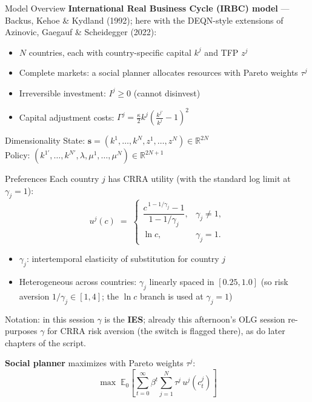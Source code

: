 \documentclass[aspectratio=169,11pt]{beamer}
\newcommand{\emphc}[1]{\textcolor{harvardcrimson}{#1}}
\newcommand{\R}{\mathbb{R}}
\begin{document}
\begin{frame}{Model Overview}
\textbf{International Real Business Cycle (IRBC) model} --- Backus, Kehoe \& Kydland (1992); here with the DEQN-style extensions of Azinovic, Gaegauf \& Scheidegger (2022):

\vspace{0.5em}
\begin{itemize}
    \item $N$ countries, each with \emphc{country-specific capital} $k^j$ and \emphc{TFP} $z^j$
    \item \emphc{Complete markets}: a social planner allocates resources with Pareto weights $\tau^j$
    \item \emphc{Irreversible investment}: $I^j \geq 0$ (cannot disinvest)
    \item \emphc{Capital adjustment costs}: $\Gamma^j = \frac{\kappa}{2} k^j \!\left(\frac{k^{j\prime}}{k^j} - 1\right)^{\!2}$
\end{itemize}

\vspace{0.5em}
\begin{block}{Dimensionality}
State: $\bm{s} = (k^1, \ldots, k^N, z^1, \ldots, z^N) \in \R^{2N}$\\
Policy: $(k^{1\prime}, \ldots, k^{N\prime}, \lambda, \mu^1, \ldots, \mu^N) \in \R^{2N+1}$
\end{block}
\end{frame}

\begin{frame}{Preferences}
\small
Each country $j$ has \emphc{CRRA utility} (with the standard log limit at $\gamma_j = 1$):
\[
u^j(c) \;=\; \begin{cases} \dfrac{c^{\,1 - 1/\gamma_j} - 1}{1 - 1/\gamma_j}, & \gamma_j \neq 1, \\[4pt] \ln c, & \gamma_j = 1. \end{cases}
\]

\vspace{0.2em}
\begin{itemize}\itemsep2pt
    \item $\gamma_j$: intertemporal elasticity of substitution for country $j$
    \item \emphc{Heterogeneous} across countries: $\gamma_j$ linearly spaced in $[0.25, 1.0]$ (so risk aversion $1/\gamma_j \in [1, 4]$; the $\ln c$ branch is used at $\gamma_j = 1$)
\end{itemize}

\vspace{0.2em}
{\scriptsize \emphc{Notation:} in this session $\gamma$ is the \textbf{IES}; already this afternoon's OLG session re-purposes $\gamma$ for CRRA risk aversion (the switch is flagged there), as do later chapters of the script.}

\vspace{0.3em}
\textbf{Social planner} maximizes with Pareto weights $\tau^j$:
\[
\max \; \mathbb{E}_0\!\left[\sum_{t=0}^{\infty} \beta^t \sum_{j=1}^{N} \tau^j \, u^j(c_t^j)\right]
\]
\end{frame}
\end{document}
